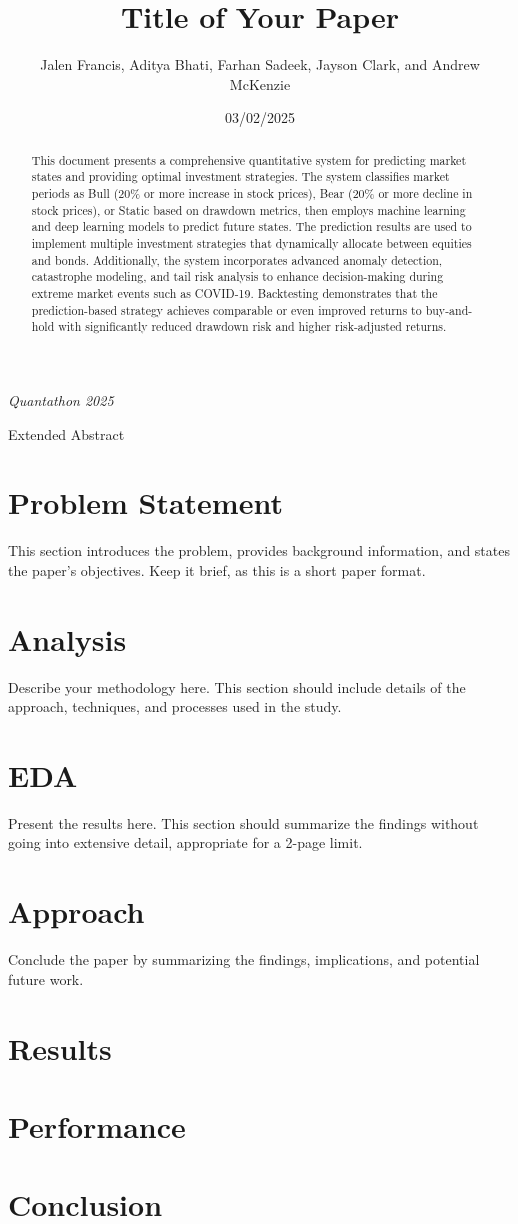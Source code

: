 \documentclass[10pt]{article}
\title{Title of Your Paper}
\author{Jalen Francis, Aditya Bhati, Farhan Sadeek, Jayson Clark, and Andrew McKenzie}
\date{03/02/2025}
\makeatletter
\renewcommand{\maketitle}{%
    \begin{center}
        \vspace*{0.5cm}
        \Large\@title
        
        \vspace{0.4cm}
        \large\@author
        
        \vspace{0.5cm}
        \normalsize\textit{Quantathon 2025}
        
        \vspace{0.3cm}
        \normalsize Extended Abstract
        \vspace{0.5cm}
    \end{center}
}
\makeatother
\begin{document}
\maketitle

\begin{abstract}
This document presents a comprehensive quantitative system for predicting market states and providing optimal investment strategies. The system classifies market periods as Bull (20\% or more increase in stock prices), Bear (20\% or more decline in stock prices), or Static based on drawdown metrics, then employs machine learning and deep learning models to predict future states. The prediction results are used to implement multiple investment strategies that dynamically allocate between equities and bonds. Additionally, the system incorporates advanced anomaly detection, catastrophe modeling, and tail risk analysis to enhance decision-making during extreme market events such as COVID-19. Backtesting demonstrates that the prediction-based strategy achieves comparable or even improved returns to buy-and-hold with significantly reduced drawdown risk and higher risk-adjusted returns.
\end{abstract}

\section{Problem Statement}
This section introduces the problem, provides background information, and states the paper's objectives. Keep it brief, as this is a short paper format.

\section{Analysis}
Describe your methodology here. This section should include details of the approach, techniques, and processes used in the study.

\section{EDA}
Present the results here. This section should summarize the findings without going into extensive detail, appropriate for a 2-page limit.

\section{Approach}
Conclude the paper by summarizing the findings, implications, and potential future work.

\section{Results}

\section{Performance}

\section{Conclusion}



\end{document}
